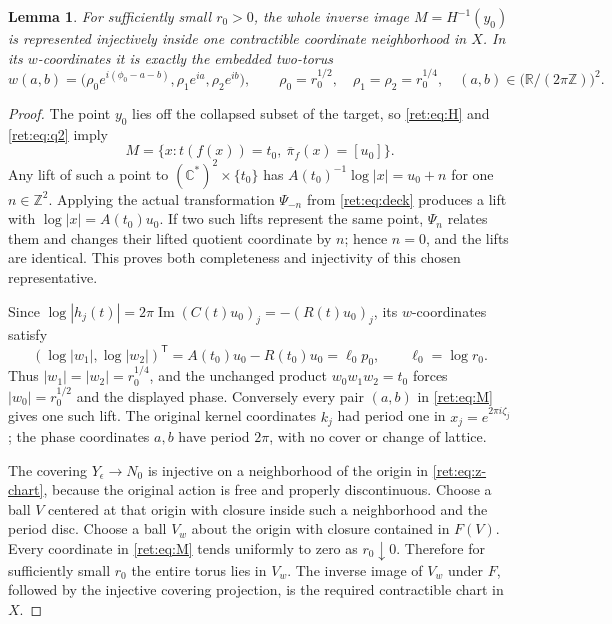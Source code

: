 \documentclass[11pt,letterpaper]{article}
\numberwithin{equation}{section}
\newtheorem{lemma}[theorem]{Lemma}
\theoremstyle{definition}
\theoremstyle{remark}
\begin{document}
\begin{lemma}
For sufficiently small \(r_0>0\), the whole inverse image
\(M=H^{-1}(y_0)\) is represented injectively inside one contractible
coordinate neighborhood in \(X\).  In its \(w\)-coordinates it is
exactly the embedded two-torus
\begin{equation}
 w(a,b)=
 \bigl(\rho_0e^{i(\phi_0-a-b)},\rho_1e^{ia},\rho_2e^{ib}\bigr),
 \qquad
 \rho_0=r_0^{1/2},\quad \rho_1=\rho_2=r_0^{1/4},
 \quad (a,b)\in\bigl(\mathbb R/(2\pi\mathbb Z)\bigr)^2.
 \label{ret:eq:M}
\end{equation}
\end{lemma}
\begin{proof}
The point \(y_0\) lies off the collapsed subset of the target, so
\eqref{ret:eq:H} and \eqref{ret:eq:q2} imply
\[
 M=\{x:t(f(x))=t_0,\ \overline\pi_f(x)=[u_0]\}.
\]
Any lift of such a point to \((\mathbb C^*)^2\times\{t_0\}\) has
\(A(t_0)^{-1}\log|x|=u_0+n\) for one \(n\in\mathbb Z^2\).
Applying the actual transformation \(\Psi_{-n}\) from
\eqref{ret:eq:deck} produces a lift with
\(\log|x|=A(t_0)u_0\).  If two such lifts represent the same point,
\(\Psi_n\) relates them and changes their lifted quotient coordinate
by \(n\); hence \(n=0\), and the lifts are identical.  This proves
both completeness and injectivity of this chosen representative.

Since
\(\log|h_j(t)|=2\pi\operatorname{Im}(C(t)u_0)_j
=-(R(t)u_0)_j\), its \(w\)-coordinates satisfy
\[
 (\log|w_1|,\log|w_2|)^{\mathsf T}
 =A(t_0)u_0-R(t_0)u_0=\ell_0p_0,
 \qquad \ell_0=\log r_0.
\]
Thus \(|w_1|=|w_2|=r_0^{1/4}\), and the unchanged product
\(w_0w_1w_2=t_0\) forces \(|w_0|=r_0^{1/2}\) and the displayed
phase.  Conversely every pair \((a,b)\) in \eqref{ret:eq:M} gives one
such lift.  The original kernel coordinates \(k_j\) had period one
in \(x_j=e^{2\pi i\zeta_j}\); the phase coordinates \(a,b\) have
period \(2\pi\), with no cover or change of lattice.

The covering \(Y_\epsilon\to N_0\) is injective on a neighborhood of
the origin in \eqref{ret:eq:z-chart}, because the original action is free
and properly discontinuous.  Choose a ball \(V\) centered at that
origin with closure inside such a neighborhood and the period disc.
Choose a ball \(V_w\) about the origin with closure contained in
\(F(V)\).  Every coordinate in \eqref{ret:eq:M} tends uniformly to zero
as \(r_0\downarrow0\).  Therefore for sufficiently small \(r_0\)
the entire torus lies in \(V_w\).  The inverse image of \(V_w\)
under \(F\), followed by the injective covering projection, is the
required contractible chart in \(X\).
\end{proof}
\end{document}
